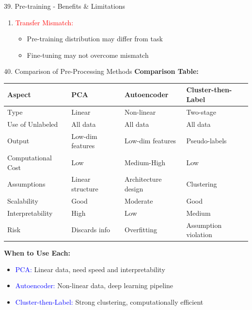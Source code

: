 \documentclass[8pt]{beamer}
\begin{document}
\begin{frame}{39. Pre-training - Benefits \& Limitations}
\begin{enumerate}
			\item \textcolor{red}{Transfer Mismatch:}
			\begin{itemize}
				\item Pre-training distribution may differ from task
				\item Fine-tuning may not overcome mismatch
			\end{itemize}
		\end{enumerate}
	\end{frame}
	
	\begin{frame}{40. Comparison of Pre-Processing Methods}
		\fontsize{6.5}{7.5}\selectfont
		\textbf{Comparison Table:}
		
		\begin{tabular}{|p{2.2cm}|p{2.2cm}|p{2.2cm}|p{2.2cm}|}
			\hline
			\textbf{Aspect} & \textbf{PCA} & \textbf{Autoencoder} & \textbf{Cluster-then-Label} \\
			\hline
			Type & Linear & Non-linear & Two-stage \\
			\hline
			Use of Unlabeled & All data & All data & All data \\
			\hline
			Output & Low-dim features & Low-dim features & Pseudo-labels \\
			\hline
			Computational Cost & Low & Medium-High & Low \\
			\hline
			Assumptions & Linear structure & Architecture design & Clustering \\
			\hline
			Scalability & Good & Moderate & Good \\
			\hline
			Interpretability & High & Low & Medium \\
			\hline
			Risk & Discards info & Overfitting & Assumption violation \\
			\hline
		\end{tabular}
		
		\textbf{When to Use Each:}
		\begin{itemize}
			\item \textcolor{blue}{PCA:} Linear data, need speed and interpretability
			\item \textcolor{blue}{Autoencoder:} Non-linear data, deep learning pipeline
			\item \textcolor{blue}{Cluster-then-Label:} Strong clustering, computationally efficient
		\end{itemize}
	\end{frame}
	
	
\end{document}
